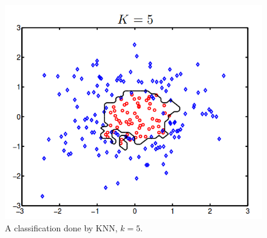 \begin{figure}[h!]
\centering
\includegraphics[scale=0.3]{../Plottar/KNN.png}
\caption{A classification done by KNN, $k = 5$.}
\label{fig:knn}
\end{figure}

